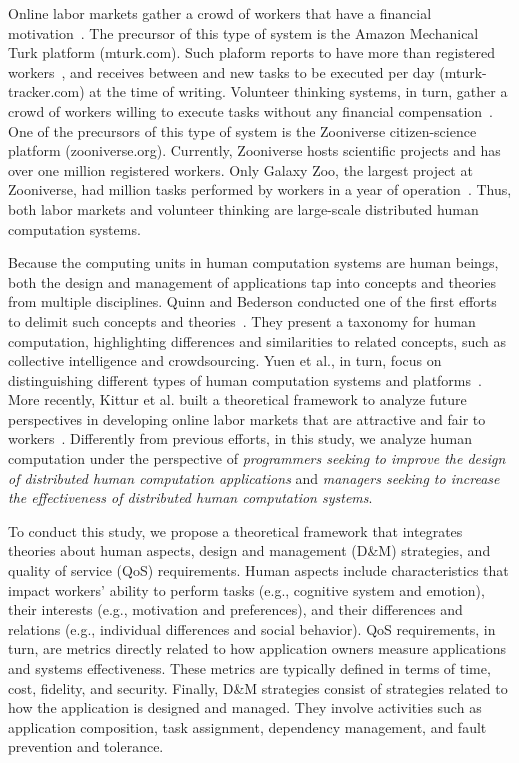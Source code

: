 \documentclass[11pt]{bmc_article_s50}
\begin{document}
Online labor markets gather a crowd of workers that have a financial motivation~\cite{Ipeirotis:2010}. The precursor of this type of system is the Amazon Mechanical Turk platform (mturk.com). Such plaform reports to have more than  registered workers~\cite{Ross:2010}, and receives between  and  new tasks to be executed per day (mturk-tracker.com) at the time of writing. Volunteer thinking systems, in turn, gather a crowd of workers willing to execute tasks without any financial compensation~\cite{Ponciano:CiSE:2014}. One of the precursors of this type of system is the Zooniverse citizen-science platform (zooniverse.org). Currently, Zooniverse hosts  scientific projects and has over one million registered workers. Only Galaxy Zoo, the largest project at Zooniverse, had  million tasks performed by  workers in a year of operation~\cite{ball:2013}. Thus, both labor markets and volunteer thinking are large-scale distributed human computation systems.

Because the computing units in human computation systems are human beings, both the design and management of applications tap into concepts and theories from multiple disciplines. Quinn and Bederson conducted one of the first efforts to delimit such concepts and theories~\cite{Quinn2011,Quinn2009}. They present a taxonomy for human computation, highlighting differences and similarities to related concepts, such as collective intelligence and crowdsourcing. Yuen et al., in turn, focus on distinguishing different types of human computation systems and platforms~\cite{Yuen:2009,King2011}. More recently, Kittur et al. built a theoretical framework to analyze future perspectives in developing online labor markets that are attractive and fair to workers~\cite{Kittur:cscw:2013}. Differently from previous efforts, in this study, we analyze human computation under the perspective of \textit{programmers seeking to improve the design of distributed human computation applications} and \textit{managers seeking to increase the effectiveness of distributed human computation systems}.

To conduct this study, we propose a theoretical framework that integrates theories about human aspects, design and management (D\&M) strategies, and quality of service (QoS) requirements. Human aspects include characteristics that impact workers' ability to perform tasks (e.g., cognitive system and emotion), their interests (e.g., motivation and preferences), and their differences and relations (e.g., individual differences and social behavior). QoS requirements, in turn, are metrics directly related to how application owners measure applications and systems effectiveness. These metrics are typically defined in terms of time, cost, fidelity, and security. Finally, D\&M strategies consist of strategies related to how the application is designed and managed. They involve activities such as application composition, task assignment, dependency management, and fault prevention and tolerance.
\end{document}
